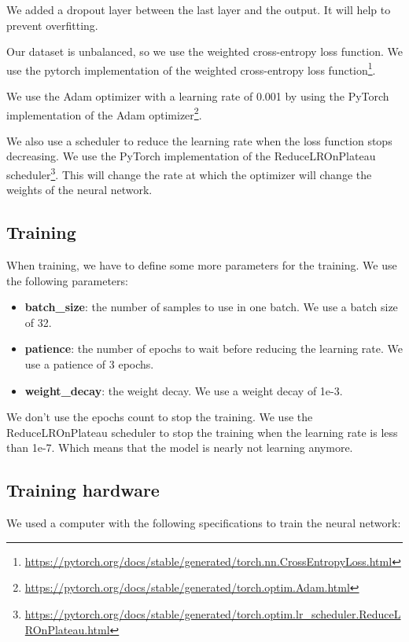 We added a dropout layer between the last layer and the output. It will help to prevent overfitting. 

Our dataset is unbalanced, so we use the weighted cross-entropy loss function. We use the pytorch implementation of the weighted cross-entropy loss function\footnote{\url{https://pytorch.org/docs/stable/generated/torch.nn.CrossEntropyLoss.html}}.

We use the Adam optimizer with a learning rate of 0.001 by using the PyTorch implementation of the Adam optimizer\footnote{\url{https://pytorch.org/docs/stable/generated/torch.optim.Adam.html}}.

We also use a scheduler to reduce the learning rate when the loss function stops decreasing. We use the PyTorch implementation of the ReduceLROnPlateau scheduler\footnote{\url{https://pytorch.org/docs/stable/generated/torch.optim.lr_scheduler.ReduceLROnPlateau.html}}. This will change the rate at which the optimizer will change the weights of the neural network.

\subsection{Training}
\label{sec:training}

When training, we have to define some more parameters for the training. We use the following parameters:

\begin{itemize}
    \item \textbf{batch\_size}: the number of samples to use in one batch. We use a batch size of 32.
    \item \textbf{patience}: the number of epochs to wait before reducing the learning rate. We use a patience of 3 epochs.
    \item \textbf{weight\_decay}: the weight decay. We use a weight decay of 1e-3.
\end{itemize}

We don't use the epochs count to stop the training. We use the ReduceLROnPlateau scheduler to stop the training when the learning rate is less than 1e-7. Which means that the model is nearly not learning anymore.

\subsection{Training hardware}
We used a computer with the following specifications to train the neural network:

